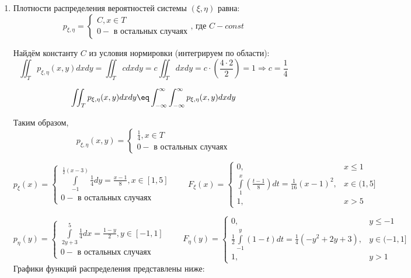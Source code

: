 \begin{enumerate}
	\item Плотности распределения вероятностей системы $(\xi, \eta)$ равна:
	\[
		p_{\xi, \eta} =
		\begin{cases}
			C, x \in T \\
			0 - \text{ в остальных случаях}
		\end{cases}
		\text{, где } C - const
	\]
	
	Найдём константу $C$ из условия нормировки (интегрируем по области):
	\[
		\iint_{T} p_{\xi, \eta} (x, y) dxdy = \iint_{T} c dxdy = c \iint_{T} dxdy = c \cdot \left( \frac{4 \cdot 2}{2} \right) = 1 \Rightarrow c = \frac{1}{4}
	\]
	\begin{remark}
		\[ \iint_{T} p_{\xi, \eta} (x, y) dxdy \eq \int_{-\infty}^{\infty}\int_{-\infty}^{\infty} p_{\xi, \eta} (x, y) dxdy \]
	\end{remark}
	Таким образом,
	\[
		p_{\xi, \eta} (x, y) =
		\begin{cases}
			\frac{1}{4}, x \in T \\
			0 - \text{ в остальных случаях}
		\end{cases}
	\]
	
	\[
		p_{\xi} (x) =
		\begin{cases}
			\int\limits_{-1}^{\frac{1}{2}(x-3)} \frac{1}{4} dy = \frac{x-1}{8}, x \in [1, 5] \\
			0 - \text{ в остальных случаях}
		\end{cases}
		~~~~~~~~~
		F_{\xi} (x) =
		\begin{cases}
			0, &x \le 1 \\
			\int\limits_{1}^{x} \left(\frac{t-1}{8}\right) dt = \frac{1}{16} (x-1)^2, &x \in (1, 5] \\
			1, &x > 5
		\end{cases}
	\]
	
	\[
		p_{\eta} (y) =
		\begin{cases}
			\int\limits_{2y+3}^{5} \frac{1}{4} dx = \frac{1-y}{2}, y \in [-1, 1] \\
			0 - \text{ в остальных случаях}
		\end{cases}
		~~~~~~~~~
		F_{\eta} (y) =
		\begin{cases}
			0, &y \le -1 \\
			\frac{1}{2}\int\limits_{-1}^{y} (1-t) dt = \frac{1}{4} (-y^2+2y+3), &y \in (-1, 1] \\
			1, &y > 1
		\end{cases}
	\]
	Графики функций распределения представлены ниже:
	\begin{figure}[H]
	\end{figure}
	

\end{enumerate}
